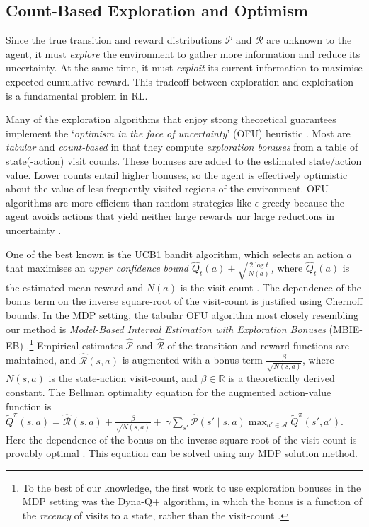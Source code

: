\documentclass{article}
\theoremstyle{definition}
\theoremstyle{definition}
\theoremstyle{plain}
\theoremstyle{plain}
\theoremstyle{plain}
\begin{document}
\subsection{Count-Based Exploration and Optimism}

Since the true transition and reward distributions $\mathcal{P}$
and $\mathcal{R}$ are unknown to the agent, it must \emph{explore}
the environment to gather more information and reduce its uncertainty.
At the same time, it must \emph{exploit} its current information to
maximise expected cumulative reward. This tradeoff between exploration
and exploitation is a fundamental problem in RL.

Many of the exploration algorithms that enjoy strong theoretical guarantees
implement the `\emph{optimism in the face of uncertainty}' (OFU) heuristic
\cite{Strehl2009}. Most are \emph{tabular }and \emph{count-based}
in that they compute \emph{exploration bonuses} from a table of state(-action)
visit counts. These bonuses are added to the estimated state/action
value. Lower counts entail higher bonuses, so the agent is effectively
optimistic about the value of less frequently visited regions of the
environment. OFU algorithms are more efficient than random strategies
like $\epsilon$-greedy because the agent avoids actions that yield
neither large rewards nor large reductions in uncertainty \cite{Osband2016a}. 

One of the best known is the UCB1 bandit algorithm, which selects
an action $a$ that maximises an \emph{upper confidence} \emph{bound
$\hat{Q}_{t}(a)+\sqrt{\frac{2\log t}{N(a)}}$, }where $\hat{Q}_{t}(a)$
is the estimated mean reward and $N(a)$ is the visit-count \cite{LR:1985bandits}.
The dependence of the bonus term on the inverse square-root of the
visit-count is justified using Chernoff bounds. In the MDP setting,
the tabular OFU algorithm most closely resembling our method is \emph{Model-Based
Interval Estimation with Exploration Bonuses} (MBIE-EB) \cite{Strehl2008}.\footnote{To the best of our knowledge, the first work to use exploration bonuses
in the MDP setting was the Dyna-Q+ algorithm, in which the bonus is
a function of the \emph{recency }of visits to a state, rather than
the visit-count \cite{Sutton:1990:IAL:101883.102055}.}\emph{ }Empirical estimates $\hat{\mathcal{P}}$ and $\hat{\mathcal{R}}$
of the transition and reward functions are maintained, and $\mathcal{\hat{R}}(s,a)$
is augmented with a bonus term $\frac{\beta}{\sqrt{N(s,a)}}$, where
$N(s,a)$ is the state-action visit-count, and $\beta\in\mathbb{R}$
is a theoretically derived constant. The Bellman optimality equation
for the augmented action-value function is $\tilde{Q}^{\pi}(s,a)=\mathcal{\hat{R}}(s,a)+\frac{\beta}{\sqrt{N(s,a)}}+\ \gamma\sum_{s'}\hat{\mathcal{P}}(s'\mid s,a)\max_{a'\in\mathcal{A}}\tilde{Q}^{\pi}(s',a')$.
Here the dependence of the bonus on the inverse square-root of the
visit-count is provably optimal \cite{Kolter2009}. This equation
can be solved using any MDP solution method. 
\end{document}
